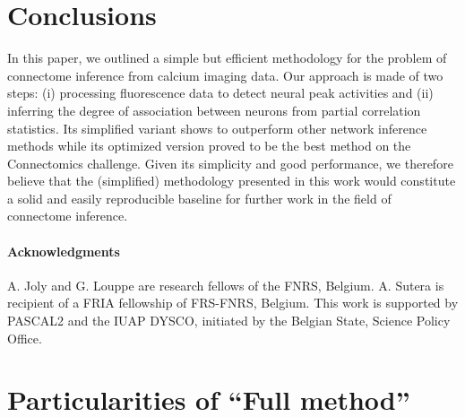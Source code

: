 \documentclass[wcp]{jmlr}
\begin{document}


\section{Conclusions} \label{sec:conclusion}

In this paper, we outlined a simple but efficient methodology for the problem
of connectome inference from calcium imaging data. Our approach is made of two
steps: (i) processing fluorescence data to detect neural peak activities and
(ii) inferring the degree of association between neurons from partial
correlation statistics. Its simplified variant shows to outperform other
network inference methods while its optimized version proved to be the best method
on the Connectomics challenge. Given its simplicity and good performance, we
therefore believe that the (simplified) methodology presented in this work
would constitute a solid and easily reproducible baseline for further work in
the field of connectome inference.


\paragraph{Acknowledgments}
A. Joly and G. Louppe are research fellows of the FNRS, Belgium.  A. Sutera is
recipient of a FRIA fellowship of FRS-FNRS, Belgium. This work is supported by
PASCAL2 and the IUAP DYSCO, initiated by the Belgian State, Science Policy
Office.



\newpage
\clearpage




\newpage
\clearpage

\appendix


\section{Particularities of ``Full method''}
\label{app:optimized}
\end{document}
